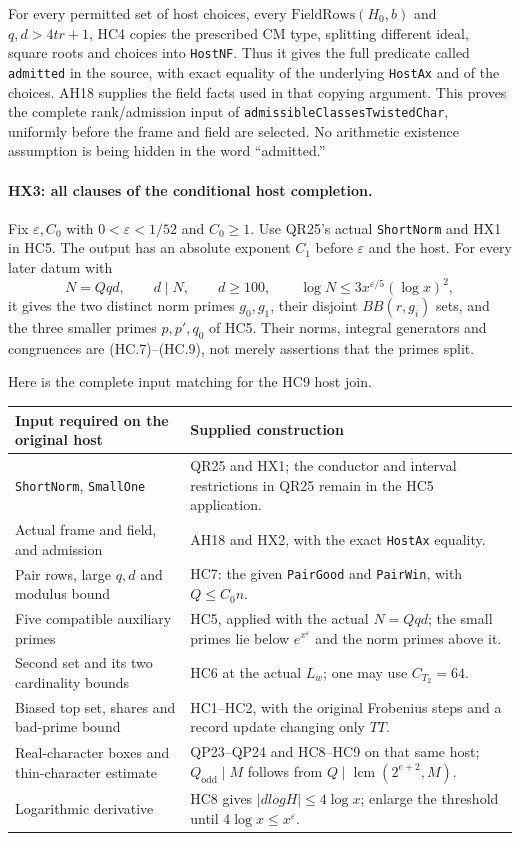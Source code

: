 For every permitted set of host choices, every
$\mathrm{FieldRows}(H_0,b)$ and $q,d>4tr+1$, HC4 copies the prescribed
CM type, splitting different ideal, square roots and choices into
\texttt{HostNF}.  Thus it gives the full predicate called
\texttt{admitted} in the source, with exact equality of the underlying
\texttt{HostAx} and of the choices.  AH18 supplies the field facts used
in that copying argument.  This proves the complete rank/admission
input of \texttt{admissibleClassesTwistedChar}, uniformly before the
frame and field are selected.  No arithmetic existence assumption is
being hidden in the word ``admitted.''

\paragraph{HX3: all clauses of the conditional host completion.}
Fix $\varepsilon,C_0$ with $0<\varepsilon<1/52$ and $C_0\ge1$.
Use QR25's actual \texttt{ShortNorm} and HX1 in HC5.  The output has
an absolute exponent $C_1$ before $\varepsilon$ and the host.
For every later datum with
\[
 N=Qqd,\qquad d\mid N,\qquad d\ge100,\qquad
 \log N\le3x^{\varepsilon/5}(\log x)^2,
 \tag{HX.7}
\]
it gives the two distinct norm primes $g_0,g_1$, their disjoint
$BB(r,g_i)$ sets, and the three smaller primes $p,p',q_0$ of HC5.
Their norms, integral generators and congruences are (HC.7)--(HC.9),
not merely assertions that the primes split.

Here is the complete input matching for the HC9 host join.
\begin{center}
\begin{tabular}{p{.33\linewidth}p{.58\linewidth}}
Input required on the original host & Supplied construction\\\hline
\texttt{ShortNorm}, \texttt{SmallOne}&QR25 and HX1; the conductor and
interval restrictions in QR25 remain in the HC5 application.\\
Actual frame and field, and admission&AH18 and HX2, with the exact
\texttt{HostAx} equality.\\
Pair rows, large $q,d$ and modulus bound&HC7: the given
\texttt{PairGood} and \texttt{PairWin}, with $Q\le C_0n$.\\
Five compatible auxiliary primes&HC5, applied with the actual $N=Qqd$;
the small primes lie below $e^{x^\varepsilon}$ and the norm primes
above it.\\
Second set and its two cardinality bounds&HC6 at the actual $L_w$;
one may use $C_{T_2}=64$.\\
Biased top set, shares and bad-prime bound&HC1--HC2, with the original
Frobenius steps and a record update changing only $TT$.\\
Real-character boxes and thin-character estimate&QP23--QP24 and
HC8--HC9 on that same host; $Q_{\mathrm{odd}}\mid M$ follows from
$Q\mid\operatorname{lcm}(2^{e+2},M)$.\\
Logarithmic derivative&HC8 gives $|dlogH|\le4\log x$; enlarge the
threshold until $4\log x\le x^\varepsilon$.\\
\end{tabular}
\end{center}

